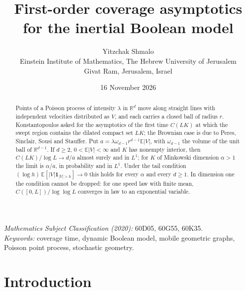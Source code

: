 \documentclass[11pt,a4paper]{article}
\title{\vspace{-1.4em}\textbf{First-order coverage asymptotics\\for the inertial Boolean model}}
\author{Yitzchak Shmalo\\[0.4em]
\small Einstein Institute of Mathematics, The Hebrew University of Jerusalem\\
\small Givat Ram, Jerusalem, Israel}
\date{16 November 2026}
\numberwithin{equation}{section}
\theoremstyle{definition}
\theoremstyle{remark}
\newcommand{\E}{\mathbb E}
\newcommand{\R}{\mathbb R}
\newcommand{\ind}{\mathbf 1}
\newcommand{\abs}[1]{\lvert#1\rvert}
\begin{document}
\maketitle
\thispagestyle{plain}

\begin{abstract}
Points of a Poisson process of intensity $\lambda$ in $\R^d$ move along
straight lines with independent velocities distributed as $V$, and each
carries a closed ball of radius $r$. Konstantopoulos asked for the asymptotics
of the first time $C(LK)$ at which the swept region contains the dilated
compact set $LK$; the Brownian case is due to Peres, Sinclair, Sousi and
Stauffer. Put $a=\lambda\omega_{d-1}r^{d-1}\E\abs{V}$, with $\omega_{d-1}$
the volume of the unit ball of $\R^{d-1}$. If $d\ge2$, $0<\E\abs V<\infty$
and $K$ has nonempty interior, then $C(LK)/\log L\to d/a$ almost surely and
in $L^1$; for $K$ of Minkowski dimension $\alpha>1$ the limit is $\alpha/a$,
in probability and in $L^1$. Under the tail condition
$(\log h)\,\E[\abs{V}\ind_{\abs{V}>h}]\to0$ this holds for every $\alpha$ and
every $d\ge1$. In dimension one the condition cannot be dropped: for one
speed law with finite mean, $C([0,L])/\log\log L$ converges in law to an
exponential variable.
\end{abstract}

\noindent\textit{Mathematics Subject Classification (2020):} 60D05, 60G55, 60K35.\\
\textit{Keywords:} coverage time, dynamic Boolean model, mobile geometric graphs, Poisson point process, stochastic geometry.

\section{Introduction}\label{sec:intro}
\end{document}
